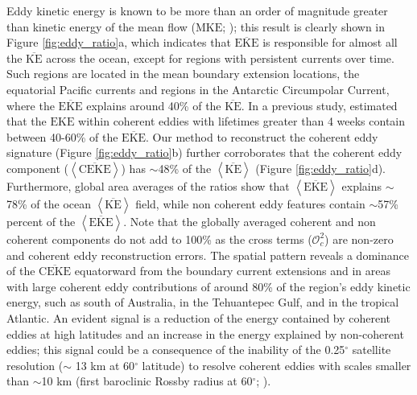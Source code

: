 \documentclass[draft,linenumbers]{agujournal2019}
\newcommand{\MKE}{\overline{\textrm{KE}}}
\newcommand{\mKE}{\textrm{MKE}}
\newcommand{\MEKE}{\overline{\textrm{EKE}}}
\newcommand{\EKE}{\textrm{EKE}}
\newcommand{\MCEKE}{\overline{\textrm{CEKE}}}
\begin{document}
	Eddy kinetic energy is known to be more than an order of magnitude greater than kinetic energy of the mean flow ($\mKE$; \citealt{Gill_Energy_1974}); this result is clearly shown in Figure \ref{fig:eddy_ratio}a, which indicates that $\MEKE$ is responsible for almost all the $\MKE$ across the ocean, except for regions with persistent currents over time. 
	Such regions are located in the mean boundary extension locations, the equatorial Pacific currents and regions in the Antarctic Circumpolar Current, where the $\MEKE$ explains around 40\% of the $\MKE$. 
	In a previous study, \citet{Chelton_The_2011} estimated that the $\EKE$ within coherent eddies with lifetimes greater than 4 weeks contain between 40-60\% of the $\MEKE$. 
	Our method to reconstruct the coherent eddy signature (Figure \ref{fig:eddy_ratio}b) further corroborates that the coherent eddy component ($\left<\MCEKE\right>$) has $\sim$48\% of the $\left<\MKE\right>$ (Figure \ref{fig:eddy_ratio}d). 
	Furthermore, global area averages of the ratios show that $\left<\MEKE\right>$ explains $\sim$78\% of the ocean $\left<\MKE\right>$ field, while non coherent eddy features contain $\sim$57\% percent of the $\left<\MEKE\right>$. 
	Note that the globally averaged coherent and non coherent components do not add to 100\% as the cross terms ($\mathcal{O}_c^2$) are non-zero and coherent eddy reconstruction errors.
	The spatial pattern reveals a dominance of the $\MCEKE$ equatorward from the boundary current extensions and in areas with large coherent eddy contributions of around 80\% of the region's eddy kinetic energy, such as south of Australia, in the Tehuantepec Gulf, and in the tropical Atlantic. 
	An evident signal is a reduction of the energy contained by coherent eddies at high latitudes and an increase in the energy explained by non-coherent eddies; this signal could be a consequence of the inability of the 0.25$^\circ$ satellite resolution ($\sim$ 13 km at 60$^\circ$ latitude) to resolve coherent eddies with scales smaller than $\sim$10 km (first baroclinic Rossby radius at 60$^\circ$; \citealt{Chelton_Geographical_1998}).

\end{document}
